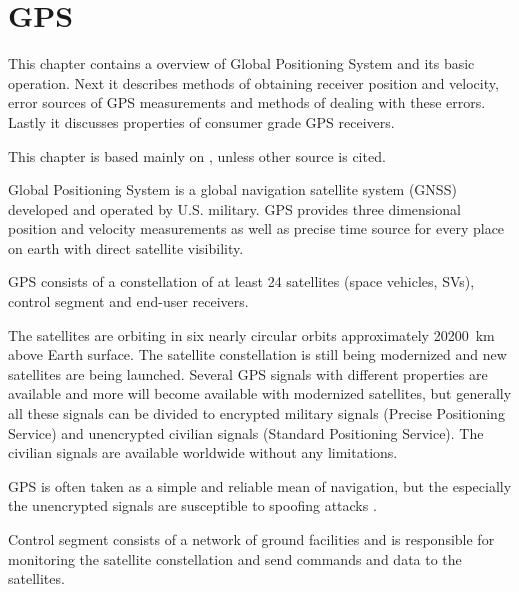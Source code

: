 \chapter{GPS}
\label{chap:gps}

This chapter contains a overview of Global Positioning System and
its basic operation.
Next it describes methods of obtaining receiver position and velocity,
error sources of GPS measurements and methods of dealing with these errors.
Lastly it discusses properties of consumer grade GPS receivers.

This chapter is based mainly on \cite{kaplan06}, unless other source is cited.

Global Positioning System is a global navigation satellite system (GNSS)
developed and operated by U.S. military.
GPS provides three dimensional position and velocity measurements as well as
precise time source for every place on earth with direct satellite visibility.

GPS consists of a constellation of at least 24 satellites (space vehicles, SVs),
control segment and end-user receivers.

The satellites are orbiting in six nearly circular orbits approximately \SI{20200}{km}
above Earth surface.
The satellite constellation is still being modernized \cite{gps-modernization-www}
and new satellites are being launched.
Several GPS signals with different properties are available and more will become available
with modernized satellites,
but generally all these signals can be divided to encrypted military signals 
(Precise Positioning Service) and unencrypted
civilian signals (Standard Positioning Service).
The civilian signals are available worldwide without any limitations.


GPS is often taken as a simple and reliable mean of navigation,
but the especially the unencrypted signals are susceptible to spoofing attacks \cite{tippenhauer11}.


Control segment consists of a network of ground facilities and is responsible for
monitoring the satellite constellation and send commands and data to the satellites.



